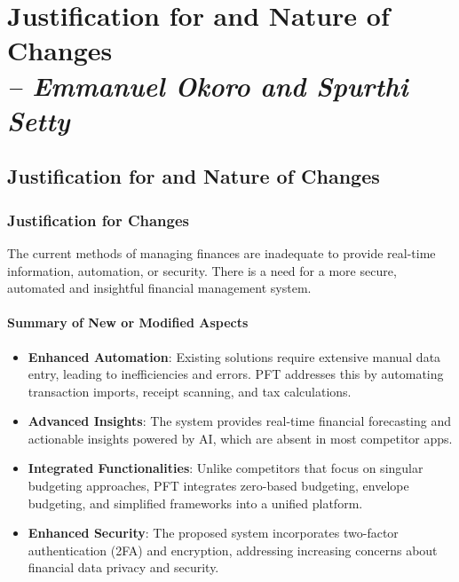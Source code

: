 \chapter{Justification for and Nature of Changes \\
\small{\textit{-- Emmanuel Okoro and Spurthi Setty}}
\label{Chapter::Justification for and Nature of Changes}}

\section{Justification for and Nature of Changes}
\subsection{Justification for Changes}
The current methods of managing finances are inadequate to provide real-time information, automation, or security. There is a need for a more secure, automated and insightful financial management system.

\subsubsection{Summary of New or Modified Aspects}
\begin{itemize}
    \item \textbf{Enhanced Automation}: Existing solutions require extensive manual data entry, leading to inefficiencies and errors. PFT addresses this by automating transaction imports, receipt scanning, and tax calculations.
    \item \textbf{Advanced Insights}: The system provides real-time financial forecasting and actionable insights powered by AI, which are absent in most competitor apps.
    \item \textbf{Integrated Functionalities}: Unlike competitors that focus on singular budgeting approaches, PFT integrates zero-based budgeting, envelope budgeting, and simplified frameworks into a unified platform.
    \item \textbf{Enhanced Security}: The proposed system incorporates two-factor authentication (2FA) and encryption, addressing increasing concerns about financial data privacy and security.
\end{itemize}

